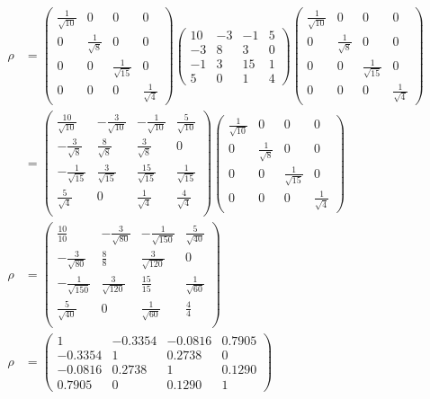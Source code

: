 \begin{align*}
\rho &= \begin{pmatrix}
\frac{1}{\sqrt{10}} & 0 & 0 & 0\\
0 &\frac{1}{\sqrt{8}}  & 0 & 0\\
0 & 0 & \frac{1}{\sqrt{15}}  & 0\\
0 &0 &0 & \frac{1}{\sqrt{4}} 
\end{pmatrix}
\begin{pmatrix}
10&-3&-1&5\\
-3&8&3&0\\
-1&3&15&1\\
5&0&1&4
\end{pmatrix}
\begin{pmatrix}
\frac{1}{\sqrt{10}} & 0 & 0 & 0\\
0 &\frac{1}{\sqrt{8}}  & 0 & 0\\
0 & 0 & \frac{1}{\sqrt{15}}  & 0\\
0 &0 &0 & \frac{1}{\sqrt{4}} 
\end{pmatrix} \\
&= 
\begin{pmatrix}
\frac{10}{\sqrt{10}} & -\frac{3}{\sqrt{10}} & -\frac{1}{\sqrt{10}} & \frac{5}{\sqrt{10}} \\
-\frac{3}{\sqrt{8}} & \frac{8}{\sqrt{8}} & \frac{3}{\sqrt{8}} & 0 \\
-\frac{1}{\sqrt{15}} & \frac{3}{\sqrt{15}} & \frac{15}{\sqrt{15}} & \frac{1}{\sqrt{15}} \\
\frac{5}{\sqrt{4}} & 0 & \frac{1}{\sqrt{4}} & \frac{4}{\sqrt{4}} \\
\end{pmatrix}
\begin{pmatrix}
\frac{1}{\sqrt{10}} & 0 & 0 & 0\\
0 &\frac{1}{\sqrt{8}}  & 0 & 0\\
0 & 0 & \frac{1}{\sqrt{15}}  & 0\\
0 &0 &0 & \frac{1}{\sqrt{4}} 
\end{pmatrix} \\
\rho &= 
\begin{pmatrix}
\frac{10}{10} & -\frac{3}{\sqrt{80}}& -\frac{1}{\sqrt{150}}& \frac{5}{\sqrt{40}} \\
-\frac{3}{\sqrt{80}} & \frac{8}{8}& \frac{3}{\sqrt{120}}& 0\\
-\frac{1}{\sqrt{150}} & \frac{3}{\sqrt{120}}& \frac{15}{15}& \frac{1}{\sqrt{60}}\\
\frac{5}{\sqrt{40}} & 0& \frac{1}{\sqrt{60}}& \frac{4}{4}\\
\end{pmatrix} \\
\rho &=
\begin{pmatrix}
1 & -0.3354 & -0.0816 & 0.7905 \\ 
-0.3354 & 1 & 0.2738 & 0 \\ 
-0.0816 & 0.2738 & 1 & 0.1290 \\
0.7905 & 0 & 0.1290 & 1
\end{pmatrix} 
\end{align*}
